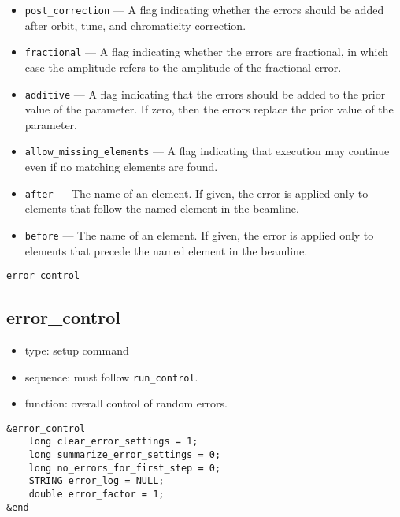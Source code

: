 \documentclass[11pt]{article}
\begin{document}
\begin{itemize}
\item \verb|post_correction| --- A flag indicating whether the errors should be added after orbit, tune, and chromaticity correction.
\item \verb|fractional| --- A flag indicating whether the errors are fractional, in which case the amplitude refers to
the amplitude of the fractional error.
\item \verb|additive| --- A flag indicating that the errors should be added to the prior value of the
parameter.  If zero, then the errors replace the prior value of the parameter.
\item \verb|allow_missing_elements| --- A flag indicating that execution may continue even if no matching elements are found.
\item \verb|after| --- The name of an element.  If given, the error is applied only to elements
 that follow the named element in the beamline.
\item \verb|before| --- The name of an element.  If given, the error is applied only to elements
 that precede the named element in the beamline.
\end{itemize}

\newpage
\begin{center}{\Large\verb|error_control|}\end{center}
\subsection{error\_control \label{subsec:errorcontrol}}

\begin{itemize}
\item type: setup command
\item sequence: must follow \verb|run_control|.
\item function: overall control of random errors.
\end{itemize}

\begin{verbatim}
&error_control
    long clear_error_settings = 1;
    long summarize_error_settings = 0;
    long no_errors_for_first_step = 0;
    STRING error_log = NULL;
    double error_factor = 1;
&end
\end{verbatim}
\end{document}
